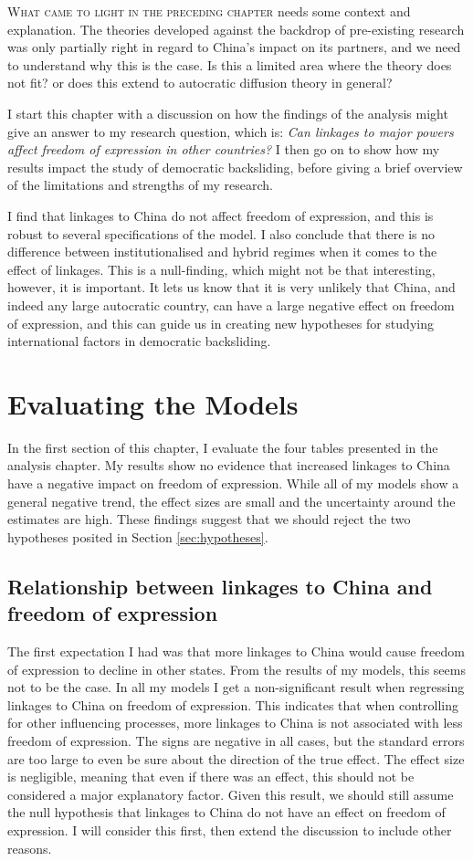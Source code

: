 \lettrine{W}{hat came to light in the preceding chapter} needs some context and explanation. The theories developed against the backdrop of pre-existing research was only partially right in regard to China's impact on its partners, and we need to understand why this is the case. Is this a limited area where the theory does not fit? or does this extend to autocratic diffusion theory in general?

I start this chapter with a discussion on how the findings of the analysis might give an answer to my research question, which is: \textit{Can linkages to major powers affect freedom of expression in other countries?} I then go on to show how my results impact the study of democratic backsliding, before giving a brief overview of the limitations and strengths of my research. 

I find that linkages to China do not affect freedom of expression, and this is robust to several specifications of the model. I also conclude that there is no difference between institutionalised and hybrid regimes when it comes to the effect of linkages. This is a null-finding, which might not be that interesting, however, it is important. It lets us know that it is very unlikely that China, and indeed any large autocratic country, can have a large negative effect on freedom of expression, and this can guide us in creating new hypotheses for studying international factors in democratic backsliding. 

\section{Evaluating the Models}
In the first section of this chapter, I evaluate the four tables presented in the analysis chapter. My results show no evidence that increased linkages to China have a negative impact on freedom of expression. While all of my models show a general negative trend, the effect sizes are small and the uncertainty around the estimates are high. These findings suggest that we should reject the two hypotheses posited in Section \ref{sec:hypotheses}.

\subsection{Relationship between linkages to China and freedom of expression}
The first expectation I had was that more linkages to China would cause freedom of expression to decline in other states. From the results of my models, this seems not to be the case. In all my models  I get a non-significant result when regressing linkages to China on freedom of expression. This indicates that when controlling for other influencing processes, more linkages to China is not associated with less freedom of expression. The signs are negative in all cases, but the standard errors are too large to even be sure about the direction of the true effect. The effect size is negligible, meaning that even if there was an effect, this should not be considered a major explanatory factor. Given this result, we should still assume the null hypothesis that linkages to China do not have an effect on freedom of expression. I will consider this first, then extend the discussion to include other reasons. 


